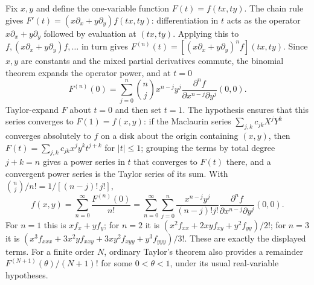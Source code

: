 Fix $x,y$ and define the one-variable function $F(t)=f(tx,ty)$.
The chain rule gives $F'(t)=(x\partial_x+y\partial_y)f(tx,ty)$:
differentiation in $t$ acts as the operator $x\partial_x+y\partial_y$
followed by evaluation at $(tx,ty)$. Applying this to
$f,(x\partial_x+y\partial_y)f,\ldots$ in turn gives
$F^{(n)}(t)=[(x\partial_x+y\partial_y)^nf](tx,ty)$. Since $x,y$ are
constants and the mixed partial derivatives commute, the binomial
theorem expands the operator power, and at $t=0$
\[
 F^{(n)}(0)=\sum_{j=0}^n\binom nj x^{n-j}y^j
          \frac{\partial^n f}{\partial x^{n-j}\partial y^j}(0,0).
\]
Taylor-expand $F$ about $t=0$ and then set $t=1$. The hypothesis
ensures that this series converges to $F(1)=f(x,y)$: if the Maclaurin
series $\sum_{j,k}c_{jk}X^jY^k$ converges absolutely to $f$ on a disk
about the origin containing $(x,y)$, then
$F(t)=\sum_{j,k}c_{jk}x^jy^kt^{j+k}$ for $|t|\le1$; grouping the terms
by total degree $j+k=n$ gives a power series in $t$ that converges to
$F(t)$ there, and a convergent power series is the Taylor series of its
sum. With $\binom nj/n!=1/[(n-j)!\,j!]$,
\[
 f(x,y)=\sum_{n=0}^\infty\frac{F^{(n)}(0)}{n!}
 =\sum_{n=0}^\infty\sum_{j=0}^n
 \frac{x^{n-j}y^j}{(n-j)!j!}
 \frac{\partial^n f}{\partial x^{n-j}\partial y^j}(0,0).
\]
For $n=1$ this is $xf_x+yf_y$; for $n=2$ it is
$(x^2f_{xx}+2xyf_{xy}+y^2f_{yy})/2!$; for $n=3$ it is
$(x^3f_{xxx}+3x^2yf_{xxy}+3xy^2f_{xyy}+y^3f_{yyy})/3!$.
These are exactly the displayed terms. For a finite order $N$, ordinary
Taylor's theorem also provides a remainder $F^{(N+1)}(\theta)/(N+1)!$
for some $0<\theta<1$, under its usual real-variable hypotheses.


